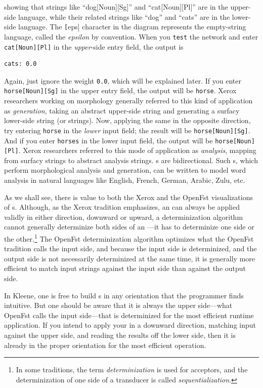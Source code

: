 \noindent
showing that strings like ``dog[Noun][Sg]'' and ``cat[Noun][Pl]'' are in the upper-side
language, while their related strings like ``dog'' and ``cats'' are in the lower-side language. 
The \texttt[eps] character in the diagram represents the empty-string language, called the
\emph{epsilon} by convention.
When you \texttt{test} the network and enter \texttt{cat[Noun][Pl]} in the \emph{upper}-side
entry field, the output is 

\begin{Verbatim}
cats: 0.0
\end{Verbatim}

\noindent
Again, just ignore the weight \texttt{0.0}, which will be explained later.  If you enter
\texttt{horse[Noun][Sg]} in the upper entry field, the output will be \texttt{horse}.  Xerox
researchers working on morphology 
generally referred to this kind of application as \emph{generation}, taking
an abstract upper-side string and generating a surfacy lower-side string (or strings).  Now,
applying the same \fst{} in the opposite direction, try entering 
\texttt{horse} in the \emph{lower} input field; the result will be \texttt{horse[Noun][Sg]}.
And if you enter \texttt{horses} in the lower input field, the output will be \texttt{horse[Noun][Pl]}.
Xerox researchers referred to this mode of application as \emph{analysis}, mapping from surfacy
strings to abstract analysis strings.  \fst{}s are bidirectional. 
Such \fst{}s, which perform morphological analysis and
generation, can be written to model word analysis in natural languages like English, French, German,
Arabic, Zulu, etc.

As we shall see, there is value to both the Xerox and the OpenFst
visualizations of \fst{}s.   Although, as the Xerox tradition emphasizes,
an \fst{} can always be applied validly in either
direction, downward or upward, a determinization algorithm cannot
generally determinize both sides of an \fst{}---it has to
determinize one side or the other.\footnote{In some traditions, the term
\emph{determinization} is used for acceptors, and the determinization of one
side of a transducer is called \emph{sequentialization}.}  The OpenFst determinization
algorithm optimizes what the OpenFst tradition calls the input side, and
because the input side is determinized, and the output side is not necessarily determinized at the same time, 
it is generally more efficient to match
input strings against the input side than against the output side. 

In Kleene, one is free to build \fst{}s in any orientation that the
programmer finds intuitive.  But one should be aware that it is always
the upper side---what OpenFst calls the input side---that is determinized
for the most efficient runtime application.  If you intend to apply
	your  \fst{} in a downward direction, matching input against the
	upper side, and reading the results off the lower side, then it is
	already in the proper orientation for the most efficient operation.  
	
